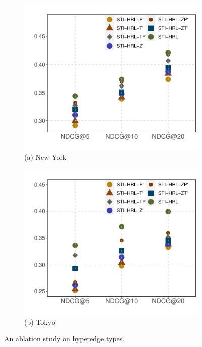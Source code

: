 \documentclass[letterpaper]{article} %
\begin{document}
\begin{figure}[!th]
\centering
\begin{subfigure}{.24\textwidth}
  \centering
  \includegraphics[width=\linewidth]{7_nyc.pdf}
  \scriptsize (a) New York
\end{subfigure}%
\begin{subfigure}{.24\textwidth}
  \centering
  \includegraphics[width=\linewidth]{7_tky.pdf}
  \scriptsize (b) Tokyo
\end{subfigure}
\caption{An ablation study on hyperedge types.}
\label{fig:ablation study on hyperedges}
\end{figure}
\end{document}

